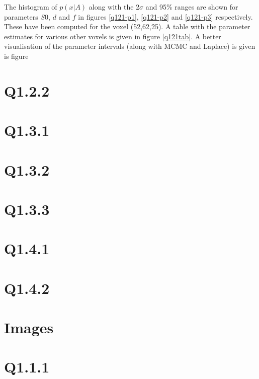 \documentclass[11pt,a4paper,oneside]{report}
\begin{document}
The histogram of $p(x|A)$ along with the $2\sigma$ and 95\% ranges are shown for parameters $S0$, $d$ and $f$ in figures \ref{q121-p1}, \ref{q121-p2} and \ref{q121-p3} respectively. These have been computed for the voxel (52,62,25). A table with the parameter estimates for various other voxels is given in figure \ref{q121tab}. A better visualisation of the parameter intervals (along with MCMC and Laplace) is given is figure 





\section*{Q1.2.2}

\section*{Q1.3.1}

\section*{Q1.3.2}

\section*{Q1.3.3}

\section*{Q1.4.1}

\section*{Q1.4.2}



\section*{Images}

\section*{Q1.1.1}
\end{document}
